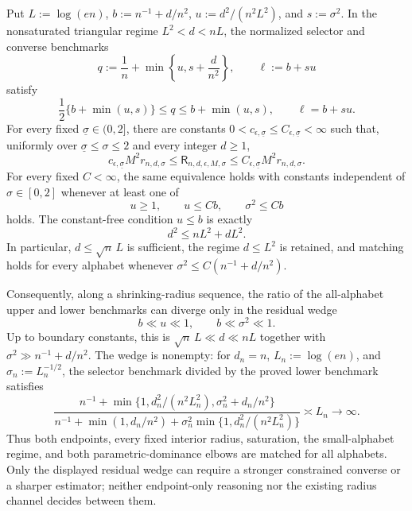 Put \(L:=\log(en)\), \(b:=n^{-1}+d/n^2\), \(u:=d^2/(n^2L^2)\), and \(s:=\sigma^2\).  In the nonsaturated triangular regime \(L^2<d<nL\), the normalized selector and converse benchmarks
\[
 q:=\frac1n+\min\left\{u,s+\frac d{n^2}\right\},
 \qquad
 \ell:=b+su
\]
satisfy
\[
 \frac12\{b+\min(u,s)\}\le q\le b+\min(u,s),
 \qquad \ell=b+su.
\]
For every fixed \(\underline\sigma\in(0,2]\), there are constants \(0<c_{\epsilon,\underline\sigma}\le C_{\epsilon,\underline\sigma}<\infty\) such that, uniformly over \(\underline\sigma\le\sigma\le2\) and every integer \(d\ge1\),
\[
 c_{\epsilon,\underline\sigma}M^2r_{n,d,\sigma}
 \le \mathsf R_{n,d,\epsilon,M,\sigma}
 \le C_{\epsilon,\underline\sigma}M^2r_{n,d,\sigma}.
\]
For every fixed \(C<\infty\), the same equivalence holds with constants independent of \(\sigma\in[0,2]\) whenever at least one of
\[
 u\ge1,
 \qquad u\le Cb,
 \qquad \sigma^2\le Cb
\]
holds.  The constant-free condition \(u\le b\) is exactly
\[
 d^2\le nL^2+dL^2.
\]
In particular, \(d\le\sqrt n\,L\) is sufficient, the regime \(d\le L^2\) is retained, and matching holds for every alphabet whenever \(\sigma^2\le C(n^{-1}+d/n^2)\).

Consequently, along a shrinking-radius sequence, the ratio of the all-alphabet upper and lower benchmarks can diverge only in the residual wedge
\[
 b\ll u\ll1,
 \qquad
 b\ll\sigma^2\ll1.
\]
Up to boundary constants, this is \(\sqrt n\,L\ll d\ll nL\) together with \(\sigma^2\gg n^{-1}+d/n^2\).  The wedge is nonempty: for \(d_n=n\), \(L_n:=\log(en)\), and \(\sigma_n:=L_n^{-1/2}\), the selector benchmark divided by the proved lower benchmark satisfies
\[
 \frac{n^{-1}+\min\{1,d_n^2/(n^2L_n^2),\sigma_n^2+d_n/n^2\}}
 {n^{-1}+\min(1,d_n/n^2)+\sigma_n^2\min\{1,d_n^2/(n^2L_n^2)\}}
 \asymp L_n\longrightarrow\infty.
\]
Thus both endpoints, every fixed interior radius, saturation, the small-alphabet regime, and both parametric-dominance elbows are matched for all alphabets.  Only the displayed residual wedge can require a stronger constrained converse or a sharper estimator; neither endpoint-only reasoning nor the existing radius channel decides between them.
